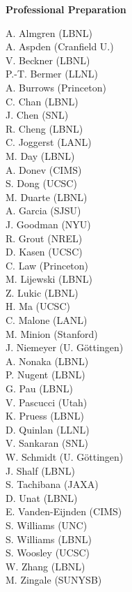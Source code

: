 \documentclass[11pt,letterpaper,english]{article}
\begin{document}
\begin{flushleft} {\bf Professional Preparation}
{A. Almgren (LBNL) \\ A. Aspden (Cranfield U.) \\ V. Beckner (LBNL) \\ P.-T. Bermer (LLNL) \\
A. Burrows (Princeton) \\ C. Chan (LBNL) \\ J. Chen (SNL) \\ 
R. Cheng (LBNL) \\ C. Joggerst (LANL) \\ 
M. Day (LBNL) \\ A. Donev (CIMS) \\ S. Dong (UCSC) \\ M. Duarte (LBNL) \\ 
A. Garcia (SJSU) \\  J. Goodman (NYU) \\ R. Grout (NREL) \\
D. Kasen (UCSC) \\ C. Law (Princeton) \\ M. Lijewski (LBNL) \\
Z. Lukic (LBNL) \\
H. Ma (UCSC) \\ C. Malone (LANL) \\ M. Minion (Stanford) \\ J. Niemeyer (U. G\"{o}ttingen) \\ 
A. Nonaka (LBNL) \\ P. Nugent (LBNL) \\ G. Pau (LBNL) \\ V. Pascucci (Utah) \\ K. Pruess (LBNL) \\
D. Quinlan (LLNL) \\
V. Sankaran (SNL) \\ W. Schmidt (U. G\"{o}ttingen) \\
J. Shalf (LBNL) \\
S. Tachibana (JAXA) \\ D. Unat (LBNL) \\ E. Vanden-Eijnden (CIMS) \\
S. Williams (UNC) \\ S. Williams (LBNL) \\ S. Woosley (UCSC) \\ W. Zhang (LBNL) \\ 
M. Zingale (SUNYSB)

}
\

\end{flushleft}
\end{document}
